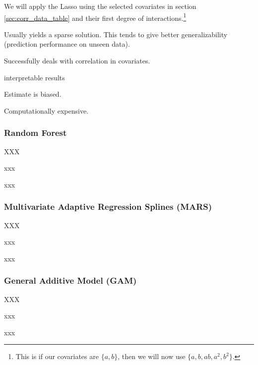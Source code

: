 {{{            We will apply the Lasso using the selected covariates in section \ref{sec:corr_data_table} and their first degree of interactions.\footnote{This is if our covariates are $\{a,b\}$, then we will now use $\{a,b,ab,a^2,b^2\}.$}
            
            \begin{my_pros_cons_table}{
                \item Usually yields a sparse solution. This tends to give better generalizability (prediction performance on unseen data).
                \item Successfully deals with correlation in covariates. 
                \item interpretable results
            }{
                \item Estimate is biased.
                \item Computationally expensive.
            }
            \end{my_pros_cons_table}
        }
        \subsubsection*{Random Forest}{
            XXX
            \begin{my_pros_cons_table}{
                \item xxx
            }{
                \item xxx
            }
            \end{my_pros_cons_table}
        }
        \subsubsection*{Multivariate Adaptive Regression Splines (MARS)}{
            XXX
            \begin{my_pros_cons_table}{
                \item xxx
            }{
                \item xxx
            }
            \end{my_pros_cons_table}
        }
        \subsubsection*{General Additive Model (GAM)}{
            XXX
            \begin{my_pros_cons_table}{
                \item xxx
            }{
                \item xxx
            }
            \end{my_pros_cons_table}
            }

}}
